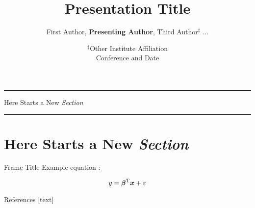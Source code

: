 \documentclass[10pt]{beamer} %
\author{
    First Author,
    \textbf{Presenting Author},
    Third Author\texorpdfstring{$^\ddagger$}, ...}
\title{
    Presentation Title}
\institute{Technical University of Denmark}
\date{\texorpdfstring{$^\ddagger$}\  Other Institute Affiliation \\[\bigskipamount]Conference and Date}
\newcommand{\transframe}[1]{
    \begin{frame}[c]{}
        \begin{center}
        \hrule \vskip 15pt
        \huge #1
        \vskip 15pt \hrule
        \end{center}
    \end{frame}
}
\newcommand{\secframe}[1]{
    \transframe{#1}
    \section{#1}
}
\renewcommand{\vec}[1]{\bm{#1}}
\newcommand{\vectrans}[1]{\vec{#1}^{\mbox{\scriptsize T}}}
\begin{document}
\begin{frame}[t,plain]
\titlepage
\end{frame}

\secframe{Here Starts a New \emph{Section}}

\begin{frame}[t]{Frame Title}
Example equation \cite{dummycite}:

\begin{align}
    y = \vectrans{\beta} \vec{x} + \varepsilon
\end{align}
\end{frame}

\begin{frame}[t]{References}  %
    [text]
    \renewcommand*{\bibfont}{\small}
    \printbibliography
\end{frame}
\end{document}
